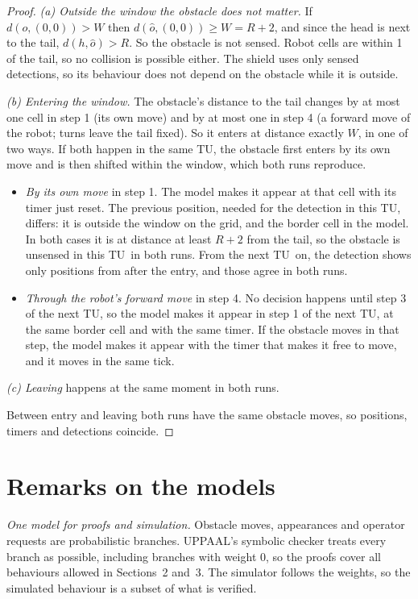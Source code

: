 \documentclass[11pt,a4paper]{article}
\theoremstyle{definition}
\newcommand{\tu}{TU}
\begin{document}
\begin{proof}
\emph{(a) Outside the window the obstacle does not matter.} If $d(o,(0,0))>W$ then $d(\hat o,(0,0))\ge W=R+2$, and since the head is next to the tail, $d(h,\hat o)>R$. So the obstacle is not sensed. Robot cells are within 1 of the tail, so no collision is possible either. The shield uses only sensed detections, so its behaviour does not depend on the obstacle while it is outside.

\emph{(b) Entering the window.} The obstacle's distance to the tail changes by at most one cell in step 1 (its own move) and by at most one in step 4 (a forward move of the robot; turns leave the tail fixed). So it enters at distance exactly $W$, in one of two ways. If both happen in the same \tu, the obstacle first enters by its own move and is then shifted within the window, which both runs reproduce.
\begin{itemize}
  \item \emph{By its own move} in step 1. The model makes it appear at that cell with its timer just reset. The previous position, needed for the detection in this \tu, differs: it is outside the window on the grid, and the border cell in the model. In both cases it is at distance at least $R+2$ from the tail, so the obstacle is unsensed in this \tu\ in both runs. From the next \tu\ on, the detection shows only positions from after the entry, and those agree in both runs.
  \item \emph{Through the robot's forward move} in step 4. No decision happens until step 3 of the next \tu, so the model makes it appear in step 1 of the next \tu, at the same border cell and with the same timer. If the obstacle moves in that step, the model makes it appear with the timer that makes it free to move, and it moves in the same tick.
\end{itemize}

\emph{(c) Leaving} happens at the same moment in both runs.

Between entry and leaving both runs have the same obstacle moves, so positions, timers and detections coincide.
\end{proof}

\section{Remarks on the models}

\emph{One model for proofs and simulation.} Obstacle moves, appearances and operator requests are probabilistic branches. UPPAAL's symbolic checker treats every branch as possible, including branches with weight 0, so the proofs cover all behaviours allowed in Sections~2 and~3. The simulator follows the weights, so the simulated behaviour is a subset of what is verified.
\end{document}
